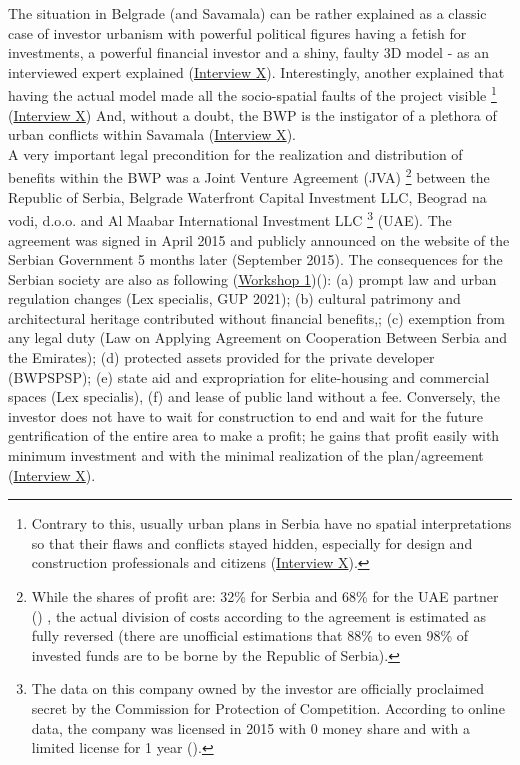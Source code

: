 \documentclass[11pt]{report}
\begin{document}
{{{{The situation in Belgrade (and Savamala) can be rather explained as a classic case of investor urbanism with powerful political figures having a fetish for investments, a powerful financial investor and a shiny, faulty 3D model - as an interviewed expert explained 
(\href{InterviewX}{Interview X}).
Interestingly, another explained that having the actual model made all the socio-spatial faults of the project visible
\footnote{Contrary to this, usually urban plans in Serbia have no spatial interpretations so that their flaws and conflicts stayed hidden, especially for design and construction professionals and citizens (\href{InterviewX}{Interview X}).}
(\href{InterviewX}{Interview X})
And, without a doubt, the BWP is the instigator of a plethora of urban conflicts within Savamala (\href{InterviewX}{Interview X}).
\\

A very important legal precondition for the realization and distribution of benefits within the BWP was a Joint Venture Agreement (JVA)
\footnote{While the shares of profit are: 32\% for Serbia and 68\% for the UAE partner (\cite{JVA BWP, 2015}) %
, the actual division of costs according to the agreement is estimated as fully reversed (there are unofficial estimations that 88\% to even 98\% of invested funds are to be borne by the Republic of Serbia).}
between the Republic of Serbia, Belgrade Waterfront Capital Investment LLC, Beograd na vodi, d.o.o. and Al Maabar International Investment LLC
\footnote{The data on this company owned by the investor are officially proclaimed secret by the Commission
for Protection of Competition. According to online data, the company was licensed in 2015 with 0 money share and with a limited license for 1 year  (\href{Analiza}{\citealt{inicijativa_ne_davimo_beograd_analiza_2016}}).} 
(UAE).
The agreement was signed in April 2015 and publicly announced on the website of the Serbian Government 5 months later (September 2015).
The consequences for the Serbian society are also as following 
(\href{Expert Workshop}{Workshop 1})(\href{Zekovic}{\citealt{zekovic_megaprojects_2016}}):
(a) prompt law and urban regulation changes (Lex specialis, GUP 2021);
(b) cultural patrimony and architectural heritage contributed without financial benefits,;
(c) exemption from any legal duty (Law on Applying Agreement on Cooperation Between Serbia and the Emirates);
(d) protected assets provided for the private developer (BWPSPSP);
(e) state aid and expropriation for elite-housing and commercial spaces (Lex specialis),
(f) and lease of public land without a fee.
Conversely, the investor does not have to wait for construction to end and wait for the future gentrification of the entire area to make a profit; he gains that profit easily with minimum investment and with the minimal realization of the plan/agreement 
(\href{InterviewX}{Interview X}).
\\

}}}}
\end{document}
